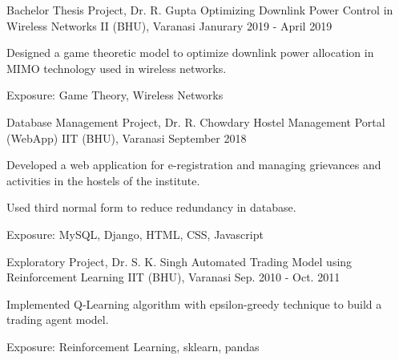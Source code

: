 \begin{cventries}
  \cventry
    {Bachelor Thesis Project, Dr. R. Gupta}
    {Optimizing Downlink Power Control in Wireless Networks}
    {II (BHU), Varanasi}
    {Janurary 2019 - April 2019}
    {
      \begin{cvitems}
        \item {Designed a game theoretic model to optimize downlink power allocation in MIMO technology used in wireless networks.}
        \item {Exposure: Game Theory, Wireless Networks}
      \end{cvitems}
    }

  \cventry
    {Database Management Project, Dr. R. Chowdary}
    {Hostel Management Portal (WebApp)}
    {IIT (BHU), Varanasi}
    {September 2018}
    {
      \begin{cvitems}
        \item {Developed a web application for e-registration and managing grievances and activities in the hostels of the institute.}
        \item {Used third normal form to reduce redundancy in database.}
        \item {Exposure: MySQL, Django, HTML, CSS, Javascript}
      \end{cvitems}
    }

  \cventry
    {Exploratory Project, Dr. S. K. Singh}
    {Automated Trading Model using Reinforcement Learning}
    {IIT (BHU), Varanasi}
    {Sep. 2010 - Oct. 2011}
    {
      \begin{cvitems}
        \item {Implemented Q-Learning algorithm with epsilon-greedy technique to build a trading agent model.}
        \item {Exposure: Reinforcement Learning, sklearn, pandas}
      \end{cvitems}
    }
\end{cventries}
